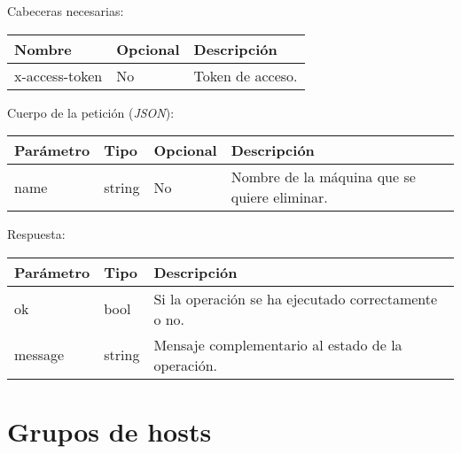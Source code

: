 Cabeceras necesarias:
\begin{table}[h!]
	\centering
	\begin{adjustbox}{max width=\textwidth}
	\begin{tabular}{|l|l|l|}
		\hline
		Nombre & Opcional & Descripción \\ \hline
		x-access-token & No & Token de acceso. \\ \hline
	\end{tabular}
\end{adjustbox}
\end{table}

Cuerpo de la petición (\textit{JSON}):
\begin{table}[h!]
	\centering
	\begin{adjustbox}{max width=\textwidth}
	\begin{tabular}{|l|l|l|l|}
		\hline
		Parámetro & Tipo & Opcional & Descripción \\ \hline
		name & string & No & Nombre de la máquina que se quiere eliminar. \\ \hline
	\end{tabular}
\end{adjustbox}
\end{table}

\pagebreak
Respuesta:
\begin{table}[h!]
	\centering
	\begin{adjustbox}{max width=\textwidth}
	\begin{tabular}{|l|l|l|}
		\hline
		Parámetro & Tipo & Descripción \\ \hline
		ok & bool & Si la operación se ha ejecutado correctamente o no. \\ \hline
		message & string & Mensaje complementario al estado de la operación. \\ \hline
	\end{tabular}
\end{adjustbox}
\end{table}










\section{Grupos de hosts}

